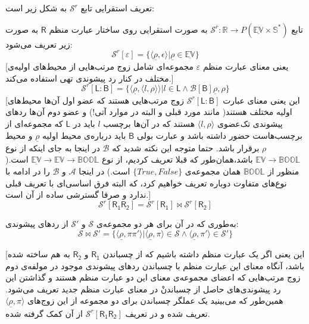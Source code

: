 تعریف استقرایی تابع 
$\mathcal{S}^r$
به شکل زیر است:
\begin{defn}
	تابع 
	$\mathcal{S}^r:\mathbb{R}\rightarrow \mathit{P}(\mathbb{\underline{EV}\times S}^*)$
	به صورت استقرایی روی ساختار عبارت منظم $\mathsf{R}$ به صورت زیر تعریف می‌شود:
$$\mathcal{S}^r[\varepsilon]= \{ \langle \underline{\rho} , \epsilon \rangle | \underline{\rho} \in \underline{\mathbb{EV}}\}$$
[یعنی معنای عبارت منظم
$\varepsilon$
مجموعه‌ای شامل زوج مرتب‌هایی از محیط‌های اولیه‌ی مختلف در کنار رد پیشوندی تهی استفاده می‌کند.]
$$\mathcal{S}^r[\mathsf{L:B}] = \{\langle\underline{\rho},\langle l , \rho \rangle \rangle | l \in \mathsf{L} \land \mathcal{B}[\mathsf{B}] \underline{\rho},\rho \}$$
[این یعنی معنای عبارت 
$\mathcal{S}^r[\mathsf{L:B}]$
زوج مرتب‌هایی هستند که عضو اول آن‌ها محیط‌های اولیه مختلف هستند( مانند مورد قبلی و البته در موارد آتی!) و عضو دوم آن‌ها ردهای پیشوندی تک‌عضوی 
$\langle l , \rho \rangle$
هستند که در آن‌ها برچسب 
$l$
باید در
$\mathsf{L}$
که مجموعه‌ای از برچسب‌هاست حضور داشته باشد و عبارت بولی 
$\mathsf{B}$
باید درباره‌ی محیط اولیه
$\underline{\rho}$
و محیط 
$\rho$
برقرار باشد. حتما متوجه این نکته شدید که 
$\mathcal{B}$
در اینجا به جای اینکه از نوع 
$\mathbb{EV} \rightarrow \mathbb{BOOL}$
باشد،همان‌طور که قبلا تعریف کردیم، از نوع
$\underline{\mathbb{EV}} \rightarrow \mathbb{EV} \rightarrow \mathbb{BOOL}$
است.( منظور از 
$\mathbb{BOOL}$
همان مجموعه‌ی 
$\{True,False\}$
است.) در اینجا 
$\mathcal{A}$
و 
$\mathcal{B}$
را در ادامه با نوع‌های متفاوت دوباره تعریف خواهیم کرد، که البته فرق اساسی‌ای با تعریف قبلی ندارد و صرفا گسترشی ساده از آن است.]
$$\mathcal{S}^r[\mathsf{R_1 R_2}]= \mathcal{S}^r[\mathsf{R_1}] \Join \mathcal{S}^r[\mathsf{R_2}]$$
\begin{center}
	به‌طوری که در آن برای هر دو مجموعه‌ی 
	$\mathcal{S}$
	و
	$\mathcal{S'}$
	از رد‌های پیشوندی:
$$\mathcal{S \Join S'}=
\{
\langle \underline{\rho}, \pi \pi' \rangle |
\langle \underline{\rho},\pi \rangle \in \mathcal{S} \land
\langle \underline{\rho},\pi' \rangle \in \mathcal{S'}
\}
$$
\end{center}
[این یعنی اگر یک عبارت منظم داشته باشیم که از چسباندن 
$\mathsf{R_1}$
و 
$\mathsf{R_2}$
به هم ساخته شده باشد، آنگاه معنای این عبارت منظم با چسباندن ردهای پیشوندی موجود در مولفه‌ی دوم زوج مرتب‌هایی که اعضای مجموعه‌ی معنای این دو عبارت منظم هستند و گذاشتن این رد پیشوندی‌های حاصل از چسباندنْ در معنای عبارت منظم جدید تعریف می‌شود. همین‌طور که می‌بینید یک عملگر چسباندن برای دو مجموعه از این زوج‌های 
$\langle \underline{\rho} , \pi \rangle$
تعریف شده و در تعریف 
$\mathcal{S}^r [\mathsf{R_1 R_2}]$
از آن کمک گرفته شده.\\

\end{defn}
